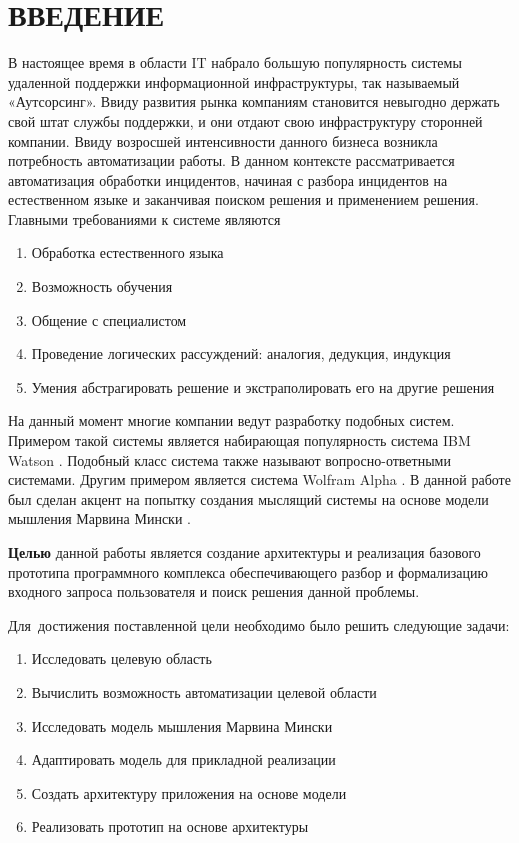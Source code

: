 \chapter*{ВВЕДЕНИЕ}							%
В настоящее время в области IT набрало большую популярность системы удаленной поддержки информационной инфраструктуры, так называемый «Аутсорсинг». Ввиду развития рынка компаниям становится невыгодно держать свой штат службы поддержки, и они отдают свою инфраструктуру сторонней компании.
Ввиду возросшей интенсивности данного бизнеса возникла потребность автоматизации работы. В данном контексте рассматривается автоматизация обработки инцидентов, начиная с разбора инцидентов на естественном языке и заканчивая поиском решения и применением решения.
Главными требованиями к системе являются
\begin{enumerate}
  \item Обработка естественного языка
  \item Возможность обучения
  \item Общение с специалистом
  \item Проведение логических рассуждений: аналогия, дедукция, индукция
  \item Умения абстрагировать решение и экстраполировать его на другие решения
\end{enumerate}
На данный момент многие компании ведут разработку подобных систем. Примером такой системы является набирающая популярность система IBM Watson \cite{Watson}. Подобный класс система также называют вопросно-ответными системами. Другим примером является система Wolfram Alpha \cite{WolframAplha}.
В данной работе был сделан акцент на попытку создания мыслящий системы на основе модели мышления Марвина Мински \cite{EmotionMachine}.

\textbf{Целью} данной работы является создание архитектуры и реализация базового прототипа программного комплекса обеспечивающего разбор и формализацию входного запроса пользователя и поиск решения данной проблемы.

Для~достижения поставленной цели необходимо было решить следующие задачи:
\begin{enumerate}
  \item Исследовать целевую область
  \item Вычислить возможность автоматизации целевой области
  \item Исследовать модель мышления Марвина Мински
  \item Адаптировать модель для прикладной реализации
  \item Создать архитектуру приложения на основе модели
  \item Реализовать прототип на основе архитектуры
\end{enumerate}

